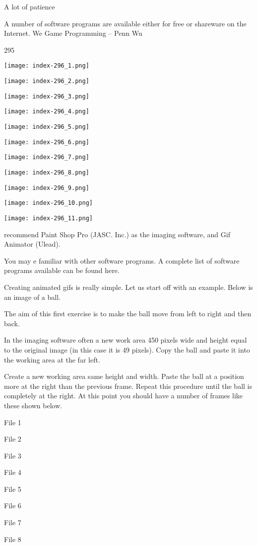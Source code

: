 \documentclass[
]{article}
\begin{document}
A lot of patience

A number of software programs are available either for free or shareware
on the Internet. We Game Programming -- Penn Wu

295

\protect\hypertarget{index_split_015.htmlux5cux23p296}{}{}\texttt{[image: index-296\_1.png]}

\texttt{[image: index-296\_2.png]}

\texttt{[image: index-296\_3.png]}

\texttt{[image: index-296\_4.png]}

\texttt{[image: index-296\_5.png]}

\texttt{[image: index-296\_6.png]}

\texttt{[image: index-296\_7.png]}

\texttt{[image: index-296\_8.png]}

\texttt{[image: index-296\_9.png]}

\texttt{[image: index-296\_10.png]}

\texttt{[image: index-296\_11.png]}

recommend Paint Shop Pro (JASC. Inc.) as the imaging software, and Gif
Animator (Ulead).

You may e familiar with other software programs. A complete list of
software programs available can be found here.

Creating animated gifs is really simple. Let us start off with an
example. Below is an image of a ball.

The aim of this first exercise is to make the ball move from left to
right and then back.

In the imaging software often a new work area 450 pixels wide and height
equal to the original image (in this case it is 49 pixels). Copy the
ball and paste it into the working area at the far left.

Create a new working area same height and width. Paste the ball at a
position more at the right than the previous frame. Repeat this
procedure until the ball is completely at the right. At this point you
should have a number of frames like these shown below.

File 1

File 2

File 3

File 4

File 5

File 6

File 7

File 8
\end{document}

